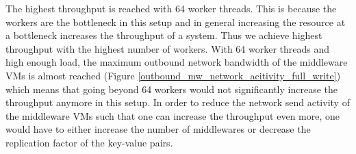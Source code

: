 The highest throughput is reached with 64 worker threads. This is because the workers are the bottleneck in this setup and in general increasing the resource at a bottleneck increases the throughput of a system. Thus we achieve highest throughput with the highest number of workers.
With 64 worker threads and high enough load, the maximum outbound network bandwidth of the middleware VMs is almost reached (Figure \ref{outbound_mw_network_acitivity_full_write}) which means that going beyond 64 workers would not significantly increase the throughput anymore in this setup. In order to reduce the network send activity of the middleware VMs such that one can increase the throughput even more, one would have to either increase the number of middlewares or decrease the replication factor of the key-value pairs.

